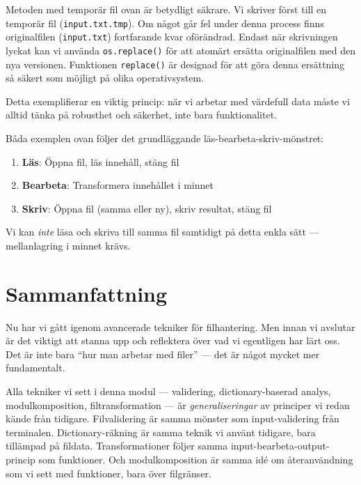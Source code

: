 
Metoden med temporär fil ovan är betydligt säkrare. Vi skriver först till en temporär fil (\texttt{input.txt.tmp}). Om något går fel under denna process finns originalfilen (\texttt{input.txt}) fortfarande kvar oförändrad. Endast när skrivningen lyckat kan vi använda \texttt{os.replace()} för att atomärt ersätta originalfilen med den nya versionen. Funktionen \texttt{replace()} är designad för att göra denna ersättning så säkert som möjligt på olika operativsystem.

Detta exemplifierar en viktig princip: när vi arbetar med värdefull data måste vi alltid tänka på robusthet och säkerhet, inte bara funktionalitet.

\begin{frame}
  \begin{remark}[Transformationsmönstret]
    Båda exemplen ovan följer det grundläggande läs-bearbeta-skriv-mönstret:
    \begin{enumerate}
      \item \textbf{Läs}: Öppna fil, läs innehåll, stäng fil
      \item \textbf{Bearbeta}: Transformera innehållet i minnet
      \item \textbf{Skriv}: Öppna fil (samma eller ny), skriv resultat, stäng fil
    \end{enumerate}
    Vi kan \emph{inte} läsa och skriva till samma fil samtidigt på detta enkla sätt
    --- mellanlagring i minnet krävs.
  \end{remark}
\end{frame}


\section{Sammanfattning}

Nu har vi gått igenom avancerade tekniker för filhantering. Men innan vi avslutar är det viktigt att stanna upp och reflektera över vad vi egentligen har lärt oss. Det är inte bara \enquote{hur man arbetar med filer} --- det är något mycket mer fundamentalt.

Alla tekniker vi sett i denna modul --- validering, dictionary-baserad analys, modulkomposition, filtransformation --- är \emph{generaliseringar} av principer vi redan kände från tidigare. Filvalidering är samma mönster som input-validering från terminalen. Dictionary-räkning är samma teknik vi använt tidigare, bara tillämpad på fildata. Transformationer följer samma input-bearbeta-output-princip som funktioner. Och modulkomposition är samma idé om återanvändning som vi sett med funktioner, bara över filgränser.

